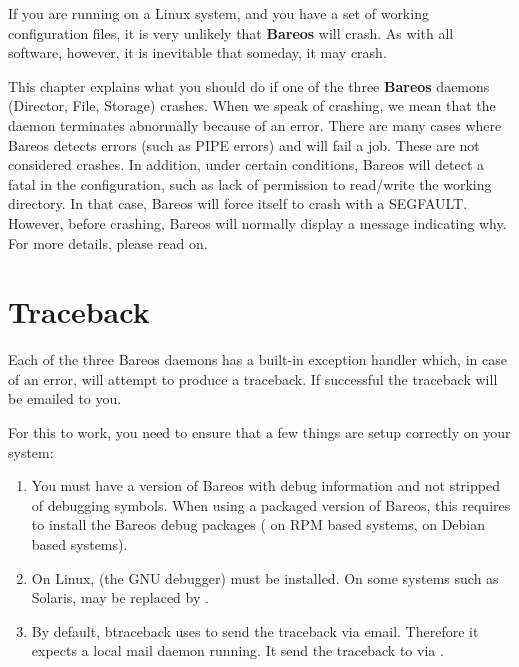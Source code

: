 
\label{debug}

If you are running on a Linux system, and you have a set of working
configuration files, it is very unlikely that {\bf Bareos} will crash. As with
all software, however, it is inevitable that someday, it may crash.

This chapter explains what you should do if one of the three {\bf Bareos}
daemons (Director, File, Storage) crashes.  When we speak of crashing, we
mean that the daemon terminates abnormally because of an error.  There are
many cases where Bareos detects errors (such as PIPE errors) and will fail
a job. These are not considered crashes.  In addition, under certain
conditions, Bareos will detect a fatal in the configuration, such as
lack of permission to read/write the working directory. In that case,
Bareos will force itself to crash with a SEGFAULT. However, before
crashing, Bareos will normally display a message indicating why.
For more details, please read on.

\section{Traceback}

Each of the three Bareos daemons has a built-in exception handler which, in
case of an error, will attempt to produce a traceback. If successful the
traceback will be emailed to you.

For this to work, you need to ensure that a few things are setup correctly on
your system:

\begin{enumerate}
\item You must have a version of Bareos with debug information and not stripped of debugging symbols.
  When using a packaged version of Bareos, this requires to install the Bareos debug packages 
  ( on RPM based systems,  on Debian based systems).

\item On Linux,  (the GNU debugger) must be installed. 
   On some systems such as Solaris,  may be replaced by .

\item By default, btraceback uses  to send the traceback via email.
   Therefore it expects a local mail daemon running. 
   It send the traceback to  via .
\end{enumerate}

